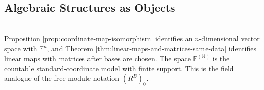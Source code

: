 \subsection{Algebraic Structures as Objects}

\begin{perspective} \label{per:finite-support-coordinate-model} \\
Proposition \ref{prop:coordinate-map-isomorphism} identifies an $n$-dimensional vector space with $\mathbb{F}^n$, and Theorem \ref{thm:linear-maps-and-matrices-same-data} identifies linear maps with matrices after bases are chosen. The space $\mathbb{F}^{(\mathbb{N})}$ is the countable standard-coordinate model with finite support. This is the field analogue of the free-module notation $(R^B)_0$.
\end{perspective}
